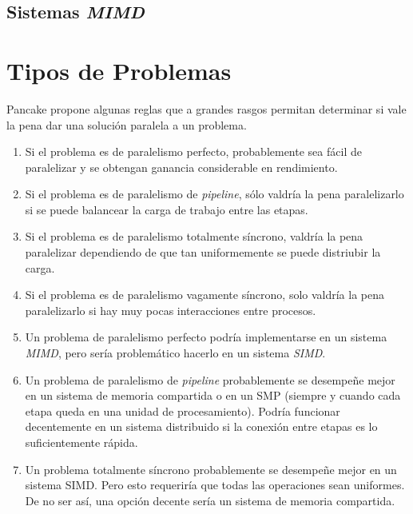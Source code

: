 \subsection{Sistemas \textit{MIMD}}

\section{Tipos de Problemas}

Pancake \cite{Pancake1996} propone algunas reglas que a grandes rasgos permitan
determinar si vale la pena dar una solución paralela a un problema.

\begin{enumerate}

    \item Si el problema es de paralelismo perfecto, probablemente sea fácil de
    paralelizar y se obtengan ganancia considerable en rendimiento.

    \item Si el problema es de paralelismo de \textit{pipeline}, sólo valdría
    la pena paralelizarlo si se puede balancear la carga de trabajo entre las
    etapas.

    \item Si el problema es de paralelismo totalmente síncrono, valdría la pena
    paralelizar dependiendo de que tan uniformemente se puede distriubir la
    carga.

    \item Si el problema es de paralelismo vagamente síncrono, solo valdría la
    pena paralelizarlo si hay muy pocas interacciones entre procesos.

    \item Un problema de paralelismo perfecto podría implementarse en un sistema
        \textit{MIMD}, pero sería problemático hacerlo en un sistema \textit{SIMD}.

    \item Un problema de paralelismo de \textit{pipeline} probablemente se
    desempeñe mejor en un sistema de memoria compartida o en un SMP (siempre y
    cuando cada etapa queda en una unidad de procesamiento). Podría funcionar
    decentemente en un sistema distribuido si la conexión entre etapas es lo
    suficientemente rápida.
    
    \item Un problema totalmente síncrono probablemente se desempeñe mejor en un
    sistema SIMD. Pero esto requeriría que todas las operaciones sean uniformes.
    De no ser así, una opción decente sería un sistema de memoria compartida.
    

\end{enumerate}
